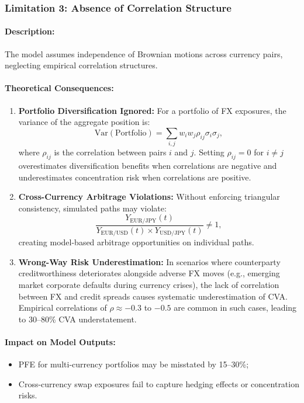\subsubsection{Limitation 3: Absence of Correlation Structure}

\paragraph{Description:}
The model assumes independence of Brownian motions across currency pairs, neglecting empirical correlation structures.

\paragraph{Theoretical Consequences:}
\begin{enumerate}
	\item \textbf{Portfolio Diversification Ignored:} For a portfolio of FX exposures, the variance of the aggregate position is:
	\begin{equation}
		\text{Var}(\text{Portfolio}) = \sum_{i,j} w_i w_j \rho_{ij} \sigma_i \sigma_j,
	\end{equation}
	where $\rho_{ij}$ is the correlation between pairs $i$ and $j$. Setting $\rho_{ij} = 0$ for $i \neq j$ overestimates diversification benefits when correlations are negative and underestimates concentration risk when correlations are positive.
	
	\item \textbf{Cross-Currency Arbitrage Violations:} Without enforcing triangular consistency, simulated paths may violate:
	\begin{equation}
		\frac{Y_{\text{EUR/JPY}}(t)}{Y_{\text{EUR/USD}}(t) \times Y_{\text{USD/JPY}}(t)} \neq 1,
	\end{equation}
	creating model-based arbitrage opportunities on individual paths.
	
	\item \textbf{Wrong-Way Risk Underestimation:} In scenarios where counterparty creditworthiness deteriorates alongside adverse FX moves (e.g., emerging market corporate defaults during currency crises), the lack of correlation between FX and credit spreads causes systematic underestimation of CVA. Empirical correlations of $\rho \approx -0.3$ to $-0.5$ are common in such cases, leading to 30--80\% CVA understatement.
\end{enumerate}

\paragraph{Impact on Model Outputs:}
\begin{itemize}
	\item PFE for multi-currency portfolios may be misstated by 15--30\%;
	\item Cross-currency swap exposures fail to capture hedging effects or concentration risks.
\end{itemize}


